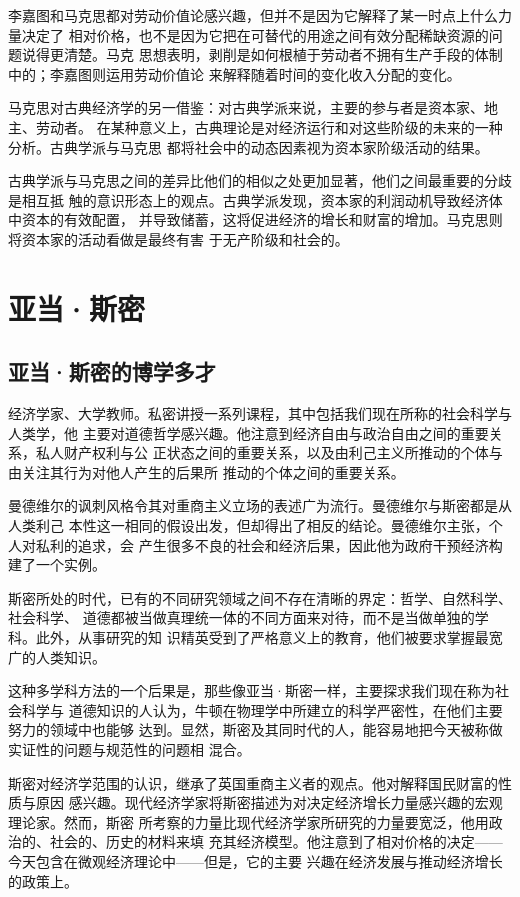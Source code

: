 李嘉图和马克思都对劳动价值论感兴趣，但并不是因为它解释了某一时点上什么力量决定了
相对价格，也不是因为它把在可替代的用途之间有效分配稀缺资源的问题说得更清楚。马克
思想表明，剥削是如何根植于劳动者不拥有生产手段的体制中的；李嘉图则运用劳动价值论
来解释随着时间的变化收入分配的变化。

马克思对古典经济学的另一借鉴：对古典学派来说，主要的参与者是资本家、地主、劳动者。
在某种意义上，古典理论是对经济运行和对这些阶级的未来的一种分析。古典学派与马克思
都将社会中的动态因素视为资本家阶级活动的结果。

古典学派与马克思之间的差异比他们的相似之处更加显著，他们之间最重要的分歧是相互抵
触的意识形态上的观点。古典学派发现，资本家的利润动机导致经济体中资本的有效配置，
并导致储蓄，这将促进经济的增长和财富的增加。马克思则将资本家的活动看做是最终有害
于无产阶级和社会的。

\chapter{亚当·斯密}

\section{亚当·斯密的博学多才}

经济学家、大学教师。私密讲授一系列课程，其中包括我们现在所称的社会科学与人类学，他
主要对道德哲学感兴趣。他注意到经济自由与政治自由之间的重要关系，私人财产权利与公
正状态之间的重要关系，以及由利己主义所推动的个体与由关注其行为对他人产生的后果所
推动的个体之间的重要关系。

曼德维尔的讽刺风格令其对重商主义立场的表述广为流行。曼德维尔与斯密都是从人类利己
本性这一相同的假设出发，但却得出了相反的结论。曼德维尔主张，个人对私利的追求，会
产生很多不良的社会和经济后果，因此他为政府干预经济构建了一个实例。

斯密所处的时代，已有的不同研究领域之间不存在清晰的界定：哲学、自然科学、社会科学、
道德都被当做真理统一体的不同方面来对待，而不是当做单独的学科。此外，从事研究的知
识精英受到了严格意义上的教育，他们被要求掌握最宽广的人类知识。

这种多学科方法的一个后果是，那些像亚当·斯密一样，主要探求我们现在称为社会科学与
道德知识的人认为，牛顿在物理学中所建立的科学严密性，在他们主要努力的领域中也能够
达到。显然，斯密及其同时代的人，能容易地把今天被称做实证性的问题与规范性的问题相
混合。

斯密对经济学范围的认识，继承了英国重商主义者的观点。他对解释国民财富的性质与原因
感兴趣。现代经济学家将斯密描述为对决定经济增长力量感兴趣的宏观理论家。然而，斯密
所考察的力量比现代经济学家所研究的力量要宽泛，他用政治的、社会的、历史的材料来填
充其经济模型。他注意到了相对价格的决定——今天包含在微观经济理论中——但是，它的主要
兴趣在经济发展与推动经济增长的政策上。

